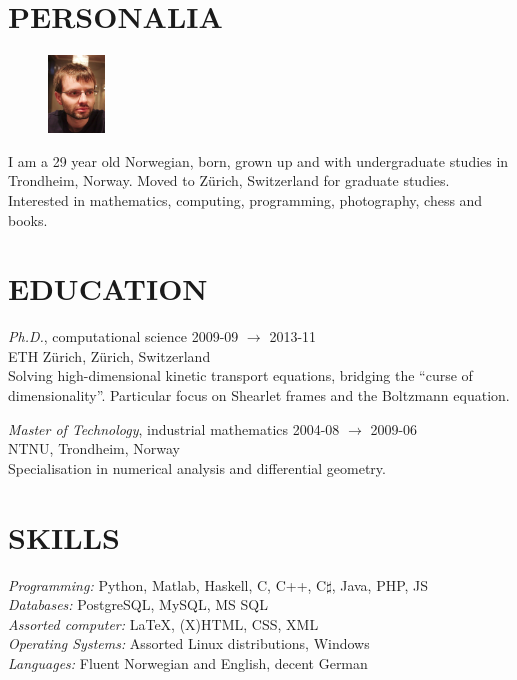 \documentclass[line,margin]{res}
\newcommand{\zh}{Z\"{u}rich}
\begin{document}
\address{Høgreina 394, NO-7079 Flatåsen}
\address{+41 41 44 98 89, evfonn@gmail.com}


\begin{resume}

\section{PERSONALIA}

\begin{figure}
  \vspace{-0.6cm}
  \includegraphics[width=1.5cm]{photo.png}
\end{figure}

I am a 29 year old Norwegian, born, grown up and with undergraduate studies in Trondheim,
Norway. Moved to Zürich, Switzerland for graduate studies. Interested in mathematics, computing,
programming, photography, chess and books.


\section{EDUCATION} 

{\em Ph.D.}, computational science \hfill 2009-09 $\to$ 2013-11 \\
ETH \zh, \zh, Switzerland \\
Solving high-dimensional kinetic transport equations, bridging the ``curse of
dimensionality''. Particular focus on Shearlet frames and the Boltzmann equation.

{\em Master of Technology}, industrial mathematics \hfill 2004-08 $\to$ 2009-06 \\
NTNU, Trondheim, Norway \\
Specialisation in numerical analysis and differential geometry.


\section{SKILLS}

{\em Programming:} Python, Matlab, Haskell, C, C++, C$\sharp$, Java, PHP, JS \\
{\em Databases:} PostgreSQL, MySQL, MS SQL \\
{\em Assorted computer:} \LaTeX, (X)HTML, CSS, XML \\
{\em Operating Systems:} Assorted Linux distributions, Windows \\
{\em Languages:} Fluent Norwegian and English, decent German



\end{resume}
\end{document}
